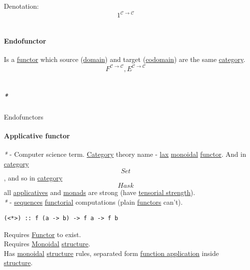 \documentclass[11pt]{article}
\begin{document}
Denotation:\\
$$ 1^{\mathcal{C \to C}} $$\\

\paragraph{\label{orga4a1776}Endofunctor}
\label{sec:orgba71607}
Is a \hyperref[orgf2f6841]{functor} which source (\hyperref[org494b48a]{domain}) and target (\hyperref[org410079d]{codomain}) are the same \hyperref[org0450535]{category}.\\

$$ F^{\mathcal{C \to C}}, E^{\mathcal{C \to C}} $$\\

\subparagraph{\emph{*}}
\label{sec:org9c523ed}

\label{orgfcca64a}Endofunctors\\

\paragraph{\label{orgfb8c69a}Applicative functor}
\label{sec:org1aceb2d}
\emph{*} - Computer science term. \hyperref[org0450535]{Category} theory name - \hyperref[org40220c9]{lax} \hyperref[orgac4647e]{monoidal} \hyperref[orgf2f6841]{functor}. And in \hyperref[org0450535]{category} $$ Set $$, and so in \hyperref[org0450535]{category} $$ Hask $$ all \hyperref[org11fa8ed]{applicatives} and \hyperref[org0d4a4ef]{monads} are strong (have \hyperref[org93f416f]{tensorial strength}).\\

\emph{*} - \hyperref[orga383401]{sequences} \hyperref[org443767a]{functorial} computations (plain \hyperref[orgdd21ed6]{functors} can't).\\

\begin{verbatim}
(<*>) :: f (a -> b) -> f a -> f b
\end{verbatim}

Requires \hyperref[orgf2f6841]{Functor} to exist.\\
Requires \hyperref[orgac4647e]{Monoidal} \hyperref[org8051f61]{structure}.\\

Has \hyperref[orgac4647e]{monoidal} \hyperref[org8051f61]{structure} rules, separated form \hyperref[org6aac242]{function application} inside \hyperref[org8051f61]{structure}.\\
\end{document}
